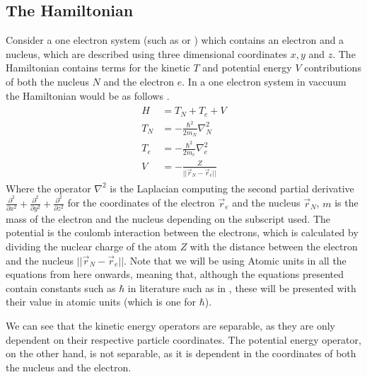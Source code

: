 \documentclass[../master_thesis.tex]{subfiles}
\begin{document}
\subsection{The Hamiltonian}
Consider a one electron system (such as  or ) which contains an
electron and a nucleus, which are described using three dimensional coordinates
$ x, y $ and $ z $. The Hamiltonian contains terms for the kinetic $T$ and
potential energy $V$ contributions of both the nucleus $ N $ and the electron
$ e $. In a one electron system in vaccuum the Hamiltonian would be as follows
\cite{Jensen:2017, Cramer:2004}.
\begin{align}
  \begin{split}
    H   &= T_N + T_e + V \\
    T_N &= -\frac{\hbar^2}{2m_N}\nabla^2_N \\
    T_e &= -\frac{\hbar^2}{2m_e}\nabla^2_e \\
    V   &= -\frac{Z}{||\vec{r}_N - \vec{r}_e||} \label{eq:twopH}
  \end{split}
\end{align}
Where the operator $ \nabla^2$ is the Laplacian computing the second partial
derivative $ \frac{\partial^2}{\partial x^2} + \frac{\partial^2}{\partial y^2} +
\frac{\partial^2}{\partial z^2} $ for the coordinates of the electron $\vec{r}_e$
and the nucleus $\vec{r}_N$, $ m $ is the mass of the electron and the nucleus
depending on the subscript used. The potential is the coulomb interaction
between the electrons, which is calculated by dividing the nuclear charge of the
atom $ Z $ with the distance between the electron and the nucleus
$ ||\vec{r}_N - \vec{r}_e|| $. Note that we will be using Atomic units in all
the equations from here onwards, meaning that, although the equations presented
contain constants such as $\hbar$ in literature such as in \cite{Atkins:2014},
these will be presented with their value in atomic units (which is one for
$\hbar$).

We can see that the kinetic energy operators are separable, as they are only
dependent on their respective particle coordinates. The potential energy
operator, on the other hand, is not separable, as it is dependent in the
coordinates of both the nucleus and the electron.
\end{document}
